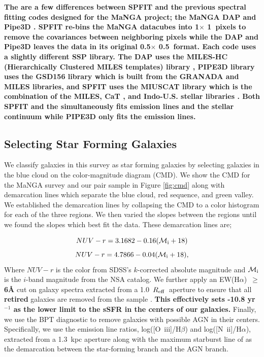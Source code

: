\documentclass[iop,revtex4,twocolumn,apj,numberedappendix,appendixfloats]{emulateapj}
\newcommand{\reff}{$R_{\rm eff}$}
\newcommand{\ewha}{EW(H$\alpha$)}
\begin{document}
\textbf{
The are a few differences between {\sc SPFIT} and the previous spectral fitting codes designed for the MaNGA project; the MaNGA {\sc DAP} \citep{Belfiore:2019} and {\sc Pipe3D} \citep{Sanchez:2016a, Sanchez:2016b}. {\sc SPFIT} re-bins the MaNGA datacubes into 1\arcsec $\times$ 1\arcsec\ pixels to remove the covariances between neighboring pixels while the {\sc DAP} and {\sc Pipe3D} leaves the data in its original 0.5\arcsec $\times$ 0.5\arcsec\ format. Each code uses a slightly different SSP library. The {\sc DAP} uses the MILES-HC (Hierarchically Clustered MILES templates) library \citep{Westfall:2019}, {\sc PIPE3D} library uses the GSD156 library \citep{Cid-Fernandes:2013} which is built from the GRANADA \citep{Martins:2005} and MILES \citep{Sanchez-Blazquez:2006} libraries, and {\sc SPFIT} uses the MIUSCAT library which is the combination of the MILES, CaT \citep{Cenarro:2001}, and Indo-U.S. stellar libraries \citep{Valdes:2004}. Both {\sc SPFIT} and the {\DAP} simultaneously fits emission lines and the stellar continuum while {\sc PIPE3D} only fits the emission lines.
}



\subsection{\textbf{Selecting Star Forming Galaxies}}\label{sec:sf}

We classify galaxies in this survey as star forming galaxies by selecting galaxies in the blue cloud on the color-magnitude diagram (CMD). We show the CMD for the MaNGA survey and our pair sample in Figure \ref{fig:cmd} along with demarcation lines which separate the blue cloud, red sequence, and green valley. We established the demarcation lines by collapsing the CMD to a color histogram for each of the three regions. We then varied the slopes between the regions until we found the slopes which best fit the data. These demarcation lines are;

\begin{equation}\label{eq:blue}
NUV-r = 3.1682 - 0.16 (\mathcal{M}_{\rm i}+18)
\end{equation}
\begin{equation}\label{eq:red}
NUV-r = 4.7866 - 0.04 (\mathcal{M}_{\rm i}+18),
\end{equation}
Where $NUV-r$ is the color from SDSS's $k$-corrected absolute magnitude and $\mathcal{M}_{\rm i}$ is the $i$-band magnitude from the NSA catalog. We further apply an \ewha\ $\ge$ \textbf{6\AA} cut on galaxy spectra extracted from a 1.0~\reff\ aperture to ensure that all \textbf{retired} galaxies are removed from the sample \citep{Cid-Fernandes:2011}. \textbf{This effectively sets -10.8 yr$^{-1}$ as the lower limit to the sSFR in the centers of our galaxies.} Finally, we use the BPT diagnostic \citep{Baldwin:1981} to remove galaxies with possible AGN in their centers. Specifically, we use the emission line ratios, log([O~{\sc iii}]/H$\beta$) and log([N~{\sc ii}]/H$\alpha$), extracted from a 1.3~kpc aperture along with the maximum starburst line of \citet{Kewley:2001} as the demarcation between the star-forming branch and the AGN branch. \textbf{}
\end{document}
